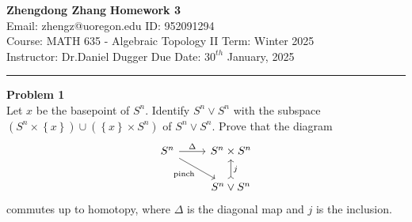 \documentclass[a4paper, 12pt]{article}
\newenvironment{problem}[2][Problem]
    { \begin{mdframed}[backgroundcolor=gray!20] \textbf{#1 #2} \\}
    {  \end{mdframed}}
\begin{document}
\noindent
\large\textbf{Zhengdong Zhang} \hfill \textbf{Homework 3}   \\
Email: zhengz@uoregon.edu \hfill ID: 952091294 \\
\normalsize Course: MATH 635 - Algebraic Topology II \hfill Term: Winter 2025\\
Instructor: Dr.Daniel Dugger \hfill Due Date: $30^{th}$ January, 2025 \\
\noindent\rule{7in}{2.8pt}

\begin{problem}{1}
Let \(x\) be the basepoint of \(S^n\). Identify \(S^n\vee S^n\) with the subspace \((S^n\times \left\{ x \right\})\cup (\left\{ x \right\}\times S^n)\) of 
\(S^n\vee S^n\). Prove that the diagram 
\[\begin{tikzcd}
	{S^n} & {S^n\times S^n} \\
	& {S^n\vee S^n}
	\arrow["\Delta", from=1-1, to=1-2]
	\arrow["{\text{pinch}}"', from=1-1, to=2-2]
	\arrow["j"', tail, from=2-2, to=1-2]
\end{tikzcd}\]
commutes up to homotopy, where \(\Delta\) is the diagonal map and \(j\) is the inclusion. 
\end{problem}
\end{document}
